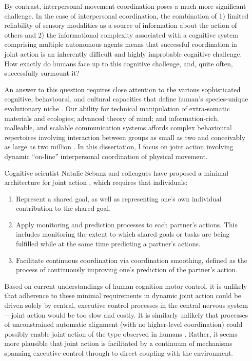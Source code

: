 \begin{CJK}{UTF8}{gbsn}
By contrast, interpersonal movement coordination poses a much more significant challenge.  In the case of interpersonal coordination, the combination of 1) limited reliability of sensory modalities as a source of information about the action of others \citep{Wilson2005,Wolpert2003,Frith2007} and 2) the informational complexity associated with a cognitive system comprising multiple autonomous agents \citep{Turvey1978} means that successful coordination in joint action is an inherently difficult and highly improbable cognitive challenge.  How exactly do humans face up to this cognitive challenge, and, quite often, successfully surmount it?

An answer to this question requires close attention to the various sophisticated cognitive, behavioural, and cultural capacities that define human's species-unique evolutionary niche \citep{Roepstorff2010,Clark2015,Fuentes2016}. Our ability for technical manipulation of extra-somatic materials and ecologies; advanced theory of mind; and information-rich, malleable, and scalable communication systems affords complex behavioural repertoires involving interaction between groups as small as two and conceivably as large as two million \citep{Pacherie2012,Nowak2017}.  In this dissertation, I focus on joint action involving dynamic ``on-line'' interpersonal coordination of physical movement.

Cognitive scientist Natalie Sebanz and colleagues have proposed a minimal architecture for joint action \citep{Sebanz2006,Vesper2010}, which requires that individuals:

\begin{enumerate}
  \item Represent a shared goal, as well as representing one’s own individual contribution to the shared goal.
  \item Apply monitoring and prediction processes to each partner’s actions. This includes monitoring the extent to which shared goals or tasks are being fulfilled while at the same time predicting a partner’s actions.
  \item Facilitate continuous coordination via coordination smoothing, defined as the process of continuously improving one’s prediction of the partner’s action.
\end{enumerate}

Based on current understandings of human cognition motor control, it is unlikely that adherence to these minimal requirements in dynamic joint action could be driven solely by central, executive control processes in the central nervous system---joint action would be too slow and costly.  It is similarly unlikely that processes of unconstrained automatic alignment (with no higher-level coordination) could possibly enable joint action of the type observed in humans \citep{Fusaroli2014}.  Rather, it seems more plausible that joint action is facilitated by a continuum of mechanisms spanning executive control through to direct coupling with the environment.


\end{CJK}

